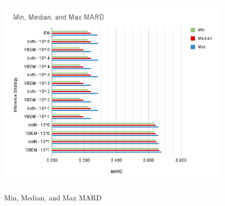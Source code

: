 


% 
% 



\begin{figure}[!t]%
  \centering
  {\includegraphics[width=\textwidth]{Min, Median, and Max MARD.png}}
  \caption{Min, Median, and Max MARD}\label{mardfig}
  \end{figure}

